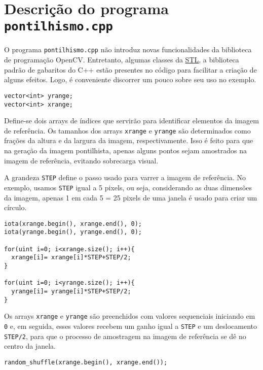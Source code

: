 \documentclass[11pt]{amsbook}
\begin{document}
\hypertarget{x-descrição-do-programa-\texttt{pontilhismo.cpp}}{\chapter{Descrição do programa \texttt{pontilhismo.cpp}}}
O programa \texttt{pontilhismo.cpp} não introduz novas funcionalidades da
biblioteca de programação OpenCV. Entretanto, algumas classes da
\href{http://www.cplusplus.com/reference/stl/}{STL}, a biblioteca padrão
de gabaritos do C++ estão presentes no código para facilitar a criação
de alguns efeitos. Logo, é conveniente discorrer um pouco sobre seu
uso no exemplo.


\begin{verbatim}
vector<int> yrange;
vector<int> xrange;
\end{verbatim}

Define-se dois arrays de índices que servirão para identificar
elementos da imagem de referência. Os tamanhos dos arrays \texttt{xrange} e
\texttt{yrange} são determinados como frações da altura e da largura da
imagem, respectivamente. Isso é feito para que na geração da imagem
pontilhista, apenas alguns pontos sejam amostrados na imagem de
referência, evitando sobrecarga visual.


A grandeza \texttt{STEP} define o passo usado para varrer a imagem de
referência. No exemplo, usamos \texttt{STEP} igual a 5 pixels, ou seja,
considerando as duas dimensões da imagem, apenas 1 em cada
5  = 25 pixels de uma janela é usado para criar um
círculo.


\begin{verbatim}
iota(xrange.begin(), xrange.end(), 0);
iota(yrange.begin(), yrange.end(), 0);

for(uint i=0; i<xrange.size(); i++){
  xrange[i]= xrange[i]*STEP+STEP/2;
}

for(uint i=0; i<yrange.size(); i++){
  yrange[i]= yrange[i]*STEP+STEP/2;
}
\end{verbatim}

Os arrays \texttt{xrange} e \texttt{yrange} são preenchidos com valores sequenciais
iniciando em \texttt{0} e, em seguida, esses valores recebem um ganho igual a
\texttt{STEP} e um deslocamento \texttt{STEP/2}, para que o processo de amostragem
na imagem de referência se dê no centro da janela.


\begin{verbatim}
random_shuffle(xrange.begin(), xrange.end());
\end{verbatim}
\end{document}
